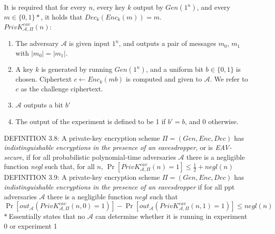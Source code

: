 It is required that for every $n$, every key $k$ output by $Gen(1^n)$, 
and every $m \in \{0,1\}\ast$, it holds that $Dec_k(Enc_k(m)) = m$.\\

$PrivK^{eav}_{\mathcal{A},\Pi}(n)$: 
\begin{enumerate}
    \item The adversary $\mathcal{A}$ is given input $1^n$, and outputs a
     pair of messages $m_0$, $m_1$ with $|m_0| = |m_1|$.
    \item A key $k$ is generated by running $Gen(1^n)$, and a uniform bit
     $b \in \{0,1\}$ is chosen. Ciphertext $c \leftarrow Enc_k(mb)$ is computed
      and given to $\mathcal{A}$. We refer to $c$ as the challenge ciphertext.
    \item $\mathcal{A}$ outputs a bit $b'$
    \item The output of the experiment is defined to be 1 if $b'=b$, and 0
    otherwise.
\end{enumerate}

DEFINITION 3.8: A private-key encryption scheme $\Pi = (Gen, Enc, Dec)$
 has \emph{indistinguishable encryptions in the presence of an eavesdropper}, or 
 is \emph{EAV-secure}, if for all probabilistic polynomial-time adversaries $\mathcal{A}$
 there is a negligible function \emph{negl} such that, for all $n$,
 $\Pr[PrivK^{eav}_{\mathcal{A},\Pi}(n)=1]\le\frac{1}{2}+negl(n)$\\

DEFINITION 3.9: A private-key encryption scheme $\Pi = (Gen, Enc, Dec)$
has \emph{indistinguishable encryptions in the presence of an eavesdropper}
if for all ppt adversaries $\mathcal{A}$ there is a negligible function $negl$ such that
$\Pr[out_{\mathcal{A}}(PrivK^{eav}_{\mathcal{A},\Pi}(n,0)=1)]
-\Pr[out_{\mathcal{A}}(PrivK^{eav}_{\mathcal{A},\Pi}(n,1)=1)]
\le negl(n)$\\
$\ast\ $Essentially states that no $\mathcal{A}$ can determine whether it is running in
experiment 0 or experiment 1